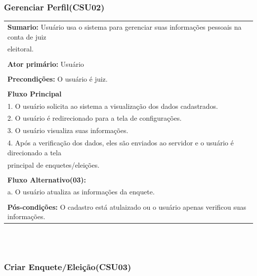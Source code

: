 \documentclass[a4paper,12pt]{article}
\begin{document}
\begin{center}
	{\subsubsection*{Gerenciar Perfil(CSU02)}}
\end{center}
\markright{}
\begin{tabular}{|l|}\hline
	{\textbf{Sumario:}} Usuário usa o sistema para gerenciar suas informações pessoais na conta de juiz\\ eleitoral. \\\\
	{\textbf{Ator primário:}} Usuário \\\\
	{\textbf{Precondições:}} O usuário é juiz.\\\\
	{\textbf{Fluxo Principal}}\\
	1. O usuário solicita ao sistema a visualização dos dados cadastrados.\\
	2. O usuário é redirecionado para a tela de configurações. \\
	3. O usuário visualiza suas informações. \\
	4. Após a verificação dos dados, eles são enviados ao servidor e o usuário é direcionado a tela\\ principal de enquetes/eleições.\\\\
	{\textbf{Fluxo Alternativo(03):}}\\
	a. O usuário atualiza as informações da enquete.\\\\
	{\textbf{Pós-condições:}} O cadastro está atulaizado ou o usuário apenas verificou suas informações.\\
	\hline
\end{tabular}
\\\\
\begin{center}
	{\subsubsection*{Criar Enquete/Eleição(CSU03)}}
\end{center}
\markright{}
\end{document}
